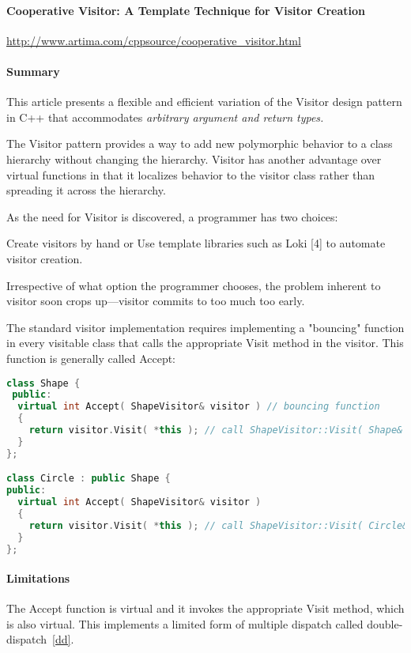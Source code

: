 \documentclass{book}
\begin{document}
\paragraph{Cooperative Visitor: A Template Technique for Visitor Creation}
\url{http://www.artima.com/cppsource/cooperative_visitor.html}
\paragraph{Summary}
This article presents a flexible and efficient variation of the Visitor design pattern in C++ that accommodates \textit{arbitrary argument and return types.}

The Visitor pattern provides a way to add new polymorphic behavior to a class hierarchy without changing the hierarchy.
Visitor has another advantage over virtual functions in that it localizes behavior to the visitor class rather than spreading it across the hierarchy.

As the need for Visitor is discovered, a programmer has two choices:

    Create visitors by hand or Use template libraries such as Loki [4] to automate visitor creation.

Irrespective of what option the programmer chooses, the problem inherent to visitor soon crops up—visitor commits to too much too early.

The standard visitor implementation requires implementing a "bouncing" function in every visitable class that calls the appropriate Visit method in the visitor.
This function is generally called Accept:

\begin{lstlisting}[caption={visitor pattern sample code 6-1},language=C++]
class Shape {
 public:
  virtual int Accept( ShapeVisitor& visitor ) // bouncing function
  {
    return visitor.Visit( *this ); // call ShapeVisitor::Visit( Shape& )
  }
};

class Circle : public Shape {
public:
  virtual int Accept( ShapeVisitor& visitor )
  {
    return visitor.Visit( *this ); // call ShapeVisitor::Visit( Circle& )
  }
};
\end{lstlisting}
\paragraph{Limitations}
The Accept function is virtual and it invokes the appropriate Visit method, which is also virtual. This implements a limited form of multiple dispatch called double-dispatch~\ref{dd}.
\end{document}
